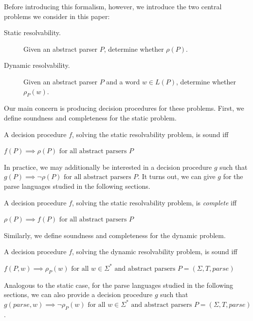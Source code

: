 \documentclass[acmsmall,review,anonymous]{acmart}\settopmatter{printfolios=true,printccs=false,printacmref=false}
\newcommand{\T}{\Sigma} %
\newcommand{\parse}{\mathit{parse}} %
\begin{document}
Before introducing this formalism, however, we introduce the two central problems we consider in this paper:

\begin{description}
\item[Static resolvability.] Given an abstract parser $P$, determine whether $\rho(P)$.
\item[Dynamic resolvability.] Given an abstract parser $P$ and a word $w \in L(P)$, determine whether $\rho_P(w)$.
\end{description}

\noindent Our main concern is producing decision procedures for these problems. First, we define soundness and completeness for the static problem.

\begin{definition}\label{def:static-procedure-sound}
  A decision procedure $f$, solving the static resolvability problem, is sound iff

  $f(P) \implies \rho(P) \text{ for all abstract parsers } P$
\end{definition}

In practice, we may additionally be interested in a decision procedure
$g$ such that $g(P) \implies \lnot \rho(P) \text{ for all abstract
  parsers } P$. It turns out, we can give $g$ for the parse languages
studied in the following sections.

\begin{definition}\label{def:static-procedure-complete}
  A decision procedure $f$, solving the static resolvability problem, is \emph{complete} iff

  $\rho(P) \implies f(P) \text{ for all abstract parsers } P$
\end{definition}


\noindent Similarly, we define soundness and completeness for the dynamic problem.

\begin{definition}\label{def:dynamic-procedure-sound}
  A decision procedure $f$, solving the dynamic resolvability problem, is sound iff

  $f(P, w) \implies \rho_P(w) \text{ for all } w \in \Sigma^{*} \text{ and abstract parsers } P = (\T, T, \parse)$
\end{definition}

\noindent Analogous to the static case, for the parse languages studied in the
following sections, we can also provide a decision procedure $g$ such
that $g(\parse, w) \implies \lnot \rho_P(w) \text{ for all } w \in
\Sigma^{*} \text{ and abstract parsers } P = (\T, T, \parse)$.
\end{document}
